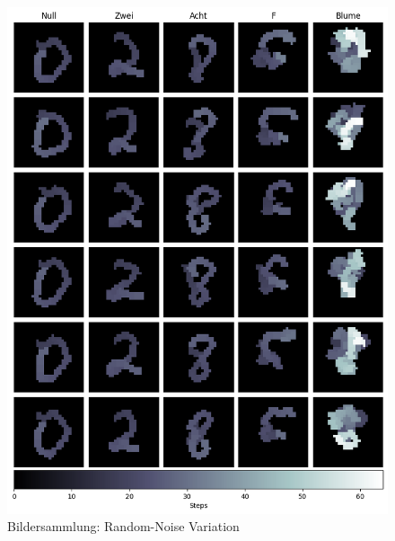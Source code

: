 \begin{figure}[!ht]
    \centering
    \includegraphics[width=\textwidth]{images/resultate/generative-np.png}
    \caption{Bildersammlung: Random-Noise Variation}\label{fig:r-randomnoise}
\end{figure}